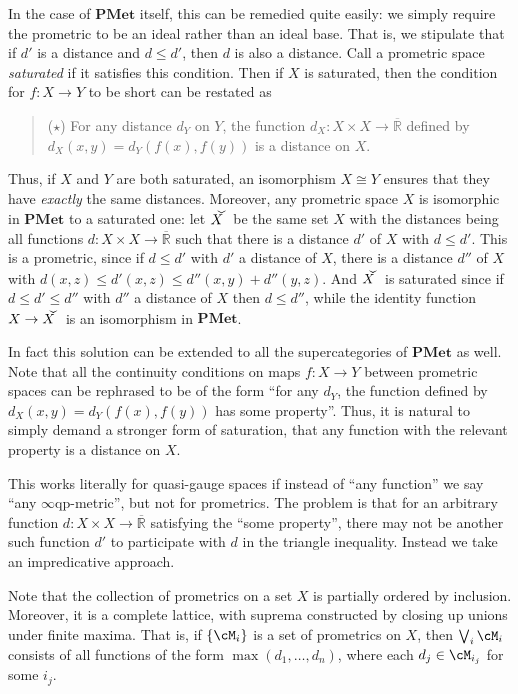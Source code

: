 \documentclass{article}
\def\R{\mathbb{R}}
\def\Re{\overline{\R}}
\def\eqp{$\infty$qp}
\def\sat#1{\widecheck{#1}}
\def\PMet{\mathbf{PMet}}
\begin{document}
In the case of $\PMet$ itself, this can be remedied quite easily: we simply require the prometric to be an ideal rather than an ideal base.
That is, we stipulate that if $d'$ is a distance and $d\le d'$, then $d$ is also a distance.
Call a prometric space \emph{saturated} if it satisfies this condition.
Then if $X$ is saturated, then the condition for $f:X\to Y$ to be short can be restated as
\begin{quote}
  ($\star$) For any distance $d_Y$ on $Y$, the function $d_X:X\times X\to \Re$ defined by $d_X(x,y) = d_Y(f(x),f(y))$ is a distance on $X$.
\end{quote}
Thus, if $X$ and $Y$ are both saturated, an isomorphism $X\cong Y$ ensures that they have \emph{exactly} the same distances.
Moreover, any prometric space $X$ is isomorphic in $\PMet$ to a saturated one: let $\sat{X}$ be the same set $X$ with the distances being all functions $d:X\times X\to \Re$ such that there is a distance $d'$ of $X$ with $d\le d'$.
This is a prometric, since if $d\le d'$ with $d'$ a distance of $X$, there is a distance $d''$ of $X$ with $d(x,z) \le d'(x,z) \le d''(x,y)+d''(y,z)$.
And $\sat{X}$ is saturated since if $d\le d' \le d''$ with $d''$ a distance of $X$ then $d\le d''$, while the identity function $X\to \sat{X}$ is an isomorphism in $\PMet$.

In fact this solution can be extended to all the supercategories of $\PMet$ as well.
Note that all the continuity conditions on maps $f:X\to Y$ between prometric spaces can be rephrased to be of the form ``for any $d_Y$, the function defined by $d_X(x,y) = d_Y(f(x),f(y))$ has some property''.
Thus, it is natural to simply demand a stronger form of saturation, that any function with the relevant property is a distance on $X$.

This works literally for quasi-gauge spaces if instead of ``any function'' we say ``any \eqp-metric'', but not for prometrics.
The problem is that for an arbitrary function $d:X\times X \to \Re$ satisfying the ``some property'', there may not be another such function $d'$ to participate with $d$ in the triangle inequality.
Instead we take an impredicative approach.

Note that the collection of prometrics on a set $X$ is partially ordered by inclusion.
Moreover, it is a complete lattice, with suprema constructed by closing up unions under finite maxima.
That is, if $\{\cM_i\}$ is a set of prometrics on $X$, then $\bigvee_i \cM_i$ consists of all functions of the form $\max(d_1,\dots,d_n)$, where each $d_j \in \cM_{i_j}$ for some $i_j$.
\end{document}
